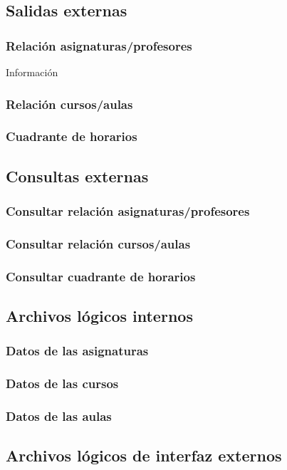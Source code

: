 \documentclass[11pt,a4paper,spanish,twoside]{book}
\begin{document}
\subsection{Salidas externas}
\subsubsection{Relación asignaturas/profesores}
Información 
\subsubsection{Relación cursos/aulas}
\subsubsection{Cuadrante de horarios}

\subsection{Consultas externas}
\subsubsection{Consultar relación asignaturas/profesores}
\subsubsection{Consultar relación cursos/aulas}
\subsubsection{Consultar cuadrante de horarios}

\subsection{Archivos lógicos internos}
\subsubsection{Datos de las asignaturas}
\subsubsection{Datos de las cursos}
\subsubsection{Datos de las aulas}

\subsection{Archivos lógicos de interfaz externos}
\end{document}
